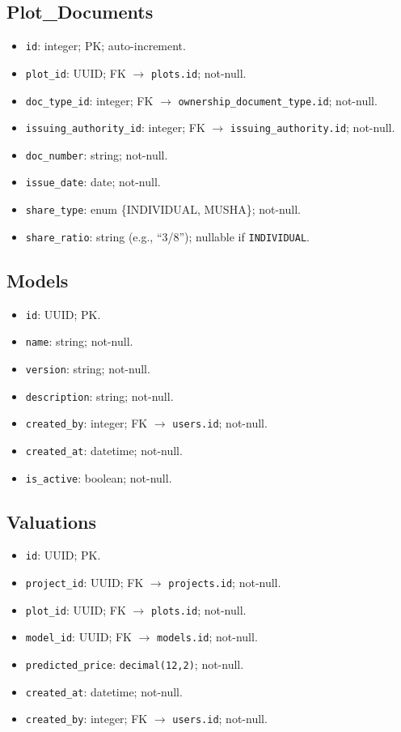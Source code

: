 \documentclass[12pt,oneside]{report}
\begin{document}
\subsection{Plot\_Documents}
\begin{itemize}[leftmargin=*,itemsep=2pt]
  \item \texttt{id}: integer; PK; auto-increment.
  \item \texttt{plot\_id}: UUID; FK $\rightarrow$ \texttt{plots.id}; not-null.
  \item \texttt{doc\_type\_id}: integer; FK $\rightarrow$ \texttt{ownership\_document\_type.id}; not-null.
  \item \texttt{issuing\_authority\_id}: integer; FK $\rightarrow$ \texttt{issuing\_authority.id}; not-null.
  \item \texttt{doc\_number}: string; not-null.
  \item \texttt{issue\_date}: date; not-null.
  \item \texttt{share\_type}: enum \{INDIVIDUAL, MUSHA\}; not-null.
  \item \texttt{share\_ratio}: string (e.g., “3/8”); nullable if \texttt{INDIVIDUAL}.
\end{itemize}

\subsection{Models}
\begin{itemize}[leftmargin=*,itemsep=2pt]
  \item \texttt{id}: UUID; PK.
  \item \texttt{name}: string; not-null.
  \item \texttt{version}: string; not-null.
  \item \texttt{description}: string; not-null.
  \item \texttt{created\_by}: integer; FK $\rightarrow$ \texttt{users.id}; not-null.
  \item \texttt{created\_at}: datetime; not-null.
  \item \texttt{is\_active}: boolean; not-null.
\end{itemize}

\subsection{Valuations}
\begin{itemize}[leftmargin=*,itemsep=2pt]
  \item \texttt{id}: UUID; PK.
  \item \texttt{project\_id}: UUID; FK $\rightarrow$ \texttt{projects.id}; not-null.
  \item \texttt{plot\_id}: UUID; FK $\rightarrow$ \texttt{plots.id}; not-null.
  \item \texttt{model\_id}: UUID; FK $\rightarrow$ \texttt{models.id}; not-null.
  \item \texttt{predicted\_price}: \texttt{decimal(12,2)}; not-null.
  \item \texttt{created\_at}: datetime; not-null.
  \item \texttt{created\_by}: integer; FK $\rightarrow$ \texttt{users.id}; not-null.
\end{itemize}
\end{document}
